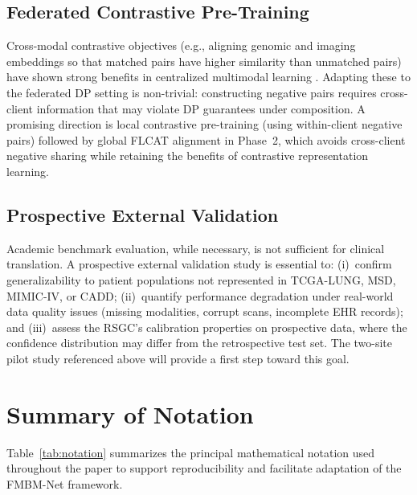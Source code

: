 \documentclass[a4paper,fleqn]{cas-dc}
\begin{document}
\subsection{Federated Contrastive Pre-Training}

Cross-modal contrastive objectives (e.g., aligning genomic and imaging
embeddings so that matched pairs have higher similarity than unmatched pairs)
have shown strong benefits in centralized multimodal learning \citep{huang2021multimodal}.
Adapting these to the federated DP setting is non-trivial: constructing
negative pairs requires cross-client information that may violate DP guarantees
under composition. A promising direction is local contrastive pre-training
(using within-client negative pairs) followed by global FLCAT alignment in
Phase~2, which avoids cross-client negative sharing while retaining the
benefits of contrastive representation learning.

\subsection{Prospective External Validation}

Academic benchmark evaluation, while necessary, is not sufficient for clinical
translation. A prospective external validation study is essential to:
(i)~confirm generalizability to patient populations not represented in
TCGA-LUNG, MSD, MIMIC-IV, or CADD; (ii)~quantify performance degradation
under real-world data quality issues (missing modalities, corrupt scans,
incomplete EHR records); and (iii)~assess the RSGC's calibration properties
on prospective data, where the confidence distribution may differ from the
retrospective test set. The two-site pilot study referenced above will
provide a first step toward this goal.

\section{Summary of Notation}
\label{sec:notation}

Table~\ref{tab:notation} summarizes the principal mathematical notation used
throughout the paper to support reproducibility and facilitate adaptation of
the FMBM-Net framework.
\end{document}
